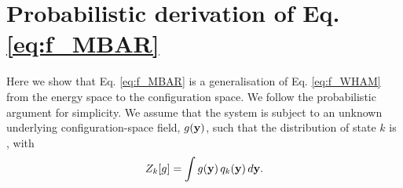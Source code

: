 \documentclass{gMOS2e}
\begin{document}
\appendices






\section{\label{sec:deriveMBAR}
Probabilistic derivation of Eq. \eqref{eq:f_MBAR}}



Here we show that
Eq. \eqref{eq:f_MBAR}
is a generalisation of Eq. \eqref{eq:f_WHAM}
from the energy space to the configuration space.
%
We follow the probabilistic argument\cite{
bartels1997, gallicchio2005, habeck2007, habeck2012, zhu2012}
for simplicity.
%
We assume that the system is subject to
an unknown underlying configuration-space field, $g(\mathbf{y})$,
such that the distribution of state $k$ is
, with
%
\begin{equation}
Z_k[g]
=
\int g(\mathbf{y}) \, q_k(\mathbf{y}) \, d\mathbf{y}.
\label{eq:Zg}
\end{equation}
\end{document}
